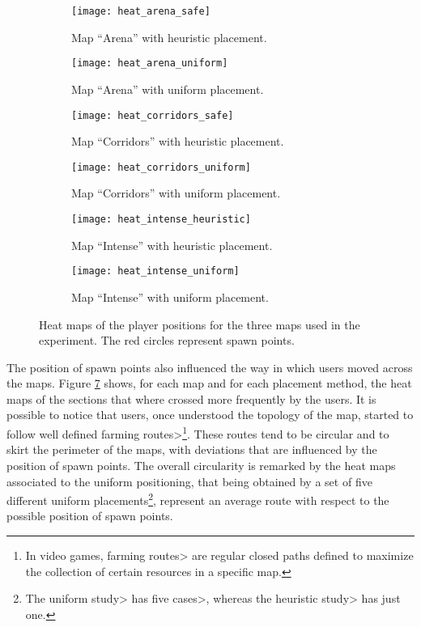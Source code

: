 \begin{figure}
	\centering
	\hfill
  	\begin{subfigure}[t]{0.385\linewidth}
		\texttt{[image: heat\_arena\_safe]}
     		\caption{Map ``Arena'' with heuristic placement.}
     		\label{img:heat_arena_safe}
 	\end{subfigure}
 	\hfill
  	\begin{subfigure}[t]{0.385\linewidth}
    		\texttt{[image: heat\_arena\_uniform]}
     		\caption{Map ``Arena'' with uniform placement.}
     		\label{img:heat_arena_uniform}
  	\end{subfigure}
  	\hfill
  	
  	\hfill
  	\begin{subfigure}[t]{0.385\linewidth}
		\texttt{[image: heat\_corridors\_safe]}
     		\caption{Map ``Corridors'' with heuristic placement.}
     		\label{img:heat_corridors_safe}
 	\end{subfigure}
 	\hfill
  	\begin{subfigure}[t]{0.385\linewidth}
    		\texttt{[image: heat\_corridors\_uniform]}
     		\caption{Map ``Corridors'' with uniform placement.}
     		\label{img:heat_corridors_uniform}
  	\end{subfigure}
 	\hfill
 	
 	\hfill
  	\begin{subfigure}[t]{0.385\linewidth}
		\texttt{[image: heat\_intense\_heuristic]}
     		\caption{Map ``Intense'' with heuristic placement.}
     		\label{img:heat_intense_heuristic}
 	\end{subfigure}
 	\hfill
  	\begin{subfigure}[t]{0.385\linewidth}
    		\texttt{[image: heat\_intense\_uniform]}
     		\caption{Map ``Intense'' with uniform placement.}
     		\label{img:heat_intense_uniform}
  	\end{subfigure}	
  	\hfill
	\caption[Heat maps of the player position for the three maps used in the experiment.]{Heat maps of the player positions for the three maps used in the experiment. The red circles represent spawn points.}
	\label{img:heat}
\end{figure}

The position of spawn points also influenced the way in which users moved across the maps. Figure \ref{img:heat} shows, for each map and for each placement method, the heat maps of the sections that where crossed more frequently by the users. It is possible to notice that users, once understood the topology of the map, started to follow well defined \<farming routes>\footnote{In video games, \<farming routes> are regular closed paths defined to maximize the collection of certain resources in a specific map.}. These routes tend to be circular and to skirt the perimeter of the maps, with deviations that are influenced by the position of spawn points. The overall circularity is remarked by the heat maps associated to the uniform positioning, that being obtained by a set of five different uniform placements\footnote{The uniform \<study> has five \<cases>, whereas the heuristic \<study> has just one.}, represent an average route with respect to the possible position of spawn points.

